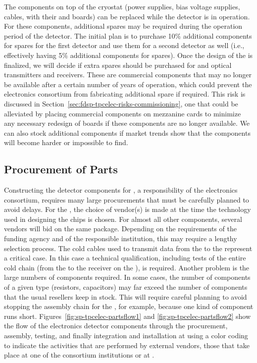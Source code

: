 The components on top of the cryostat (power supplies, bias
voltage supplies, cables,  with their 
and  boards) can be replaced while the
detector is in operation. For these components, additional spares may be required
during the \dunelifetime operation period of the  detector.
The initial plan is to purchase 10\% additional components for spares for the first
 detector and use them for a second detector as well
(i.e., effectively having 5\% additional components for spares). Once the design of
the  is finalized, we will decide if 
extra spares should be purchased for  and optical
transmitters and receivers. These are commercial components 
that may no longer be available after a certain number of 
years of operation, which could prevent the  electronics consortium from
fabricating additional spare  if required. This
risk is discussed in Section~\ref{sec:fdsp-tpcelec-risks-commissioning}, one that
could be alleviated by placing commercial components
on mezzanine cards to minimize any necessary redesign of
boards if these components are no longer available.
We can also stock additional components
if market trends show that the components will  
become harder or impossible to find.

\subsection{Procurement of Parts}
\label{sec:fdsp-tpcelec-production-procurement}

Constructing the detector components for , a responsibility 
of the  electronics consortium, requires many large procurements that 
must be carefully planned to avoid delays. For the , the 
choice of vendor(s) is made at the time the technology used in designing 
the chips is chosen. For almost all other components, several vendors 
will bid on the same package. Depending on the requirements of the funding
agency and of the responsible institution, this may require a lengthy
selection process. The cold cables used to transmit data from the
 to the  represent a critical case. In this case
a technical qualification, including tests of the entire cold chain (from the 
to the receiver on the ), is required. Another problem is the 
large numbers of components required. In some cases, the number of components 
of a given type (resistors, capacitors) may far exceed the number of components
that the usual resellers keep in stock. This will 
require careful planning to avoid stopping the assembly chain for
the , for example, because 
one kind of component runs short. Figures~\ref{fig:sp-tpcelec-partsflow1}
and \ref{fig:sp-tpcelec-partsflow2} show the flow of the 
electronics detector components through the procurement, assembly,
 testing, and finally integration and installation at 
 using a color coding to indicate the activities that
are performed by external vendors, those that take place at one of
the consortium institutions or at .

